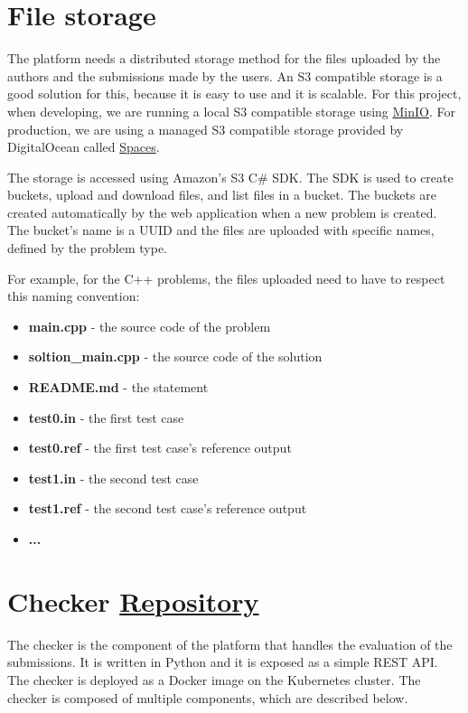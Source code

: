 \documentclass[12pt,a4paper]{report}
\begin{document}
\section{File storage}
The platform needs a distributed storage method for the files uploaded by the authors and the submissions made by the users. An S3 compatible storage is a good solution for this, because it is easy to use and it is scalable. For this project, when developing, we are running a local S3 compatible storage using \href{https://min.io/}{MinIO}. For production, we are using a managed S3 compatible storage provided by DigitalOcean called \href{https://www.digitalocean.com/products/spaces/}{Spaces}.

The storage is accessed using Amazon's S3 C\# SDK. The SDK is used to create buckets, upload and download files, and list files in a bucket. The buckets are created automatically by the web application when a new problem is created. The bucket's name is a UUID and the files are uploaded with specific names, defined by the problem type.

\newpage
For example, for the C++ problems, the files uploaded need to have to respect this naming convention:

\begin{itemize}
	\item \textbf{main.cpp} - the source code of the problem
	\item \textbf{soltion\_main.cpp} - the source code of the solution
	\item \textbf{README.md} - the statement
	\item \textbf{test0.in} - the first test case
	\item \textbf{test0.ref} - the first test case's reference output
	\item \textbf{test1.in} - the second test case
	\item \textbf{test1.ref} - the second test case's reference output
	\item \textbf{...}
\end{itemize}

\section{Checker \href{https://github.com/acadnet-dev/checker}{ Repository}}
The checker is the component of the platform that handles the evaluation of the submissions. It is written in Python and it is exposed as a simple REST API. The checker is deployed as a Docker image on the Kubernetes cluster. The checker is composed of multiple components, which are described below.
\end{document}
